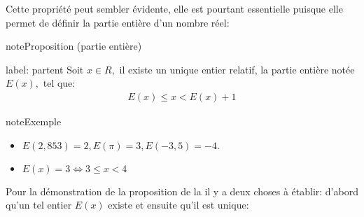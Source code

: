 \documentclass[letterpaper,10pt,french]{jupyterBook}
\begin{document}
\sphinxAtStartPar
Cette propriété peut sembler évidente, elle est pourtant essentielle puisque elle permet de définir la partie entière
d’un nombre réel:

\begin{sphinxadmonition}{note}{Proposition (partie entière)}

\sphinxAtStartPar
label: partent
Soit \(x\in R,\) il existe un unique entier relatif, la partie entière notée \(E(x),\) tel que:
\begin{equation*}
\begin{split}
E(x)\leq x< E(x)+1
\end{split}
\end{equation*}\end{sphinxadmonition}

\begin{sphinxadmonition}{note}{Exemple}
\begin{itemize}
\item {} 
\sphinxAtStartPar
\(E(2, 853) = 2, E(\pi) = 3, E(-3,5) =-4.\)

\item {} 
\sphinxAtStartPar
\(E(x)=3\Leftrightarrow 3\leq x <4\)

\end{itemize}
\end{sphinxadmonition}

\sphinxAtStartPar
Pour la démonstration de la proposition de la  il y a deux choses à établir: d’abord qu’un tel entier \(E(x)\) existe et ensuite
qu’il est unique:
\end{document}
